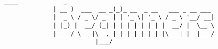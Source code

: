 \begin{center}
\begin{center}
\begin{lstlisting}[basicstyle=\ttfamily,frame=none]
               ____             _                                
              | __ )  ___  __ _(_)_ __  _ __   ___ _ __ ___      
              |  _ \ / _ \/ _` | | '_ \| '_ \ / _ \ '__/ __|     
              | |_) |  __/ (_| | | | | | | | |  __/ |  \__ \     
              |____/ \___|\__, |_|_| |_|_| |_|\___|_|  |___/     
                          |___/                                  
\end{lstlisting}
\end{center}

\fi

\vspace*{\fill}
\end{center}
